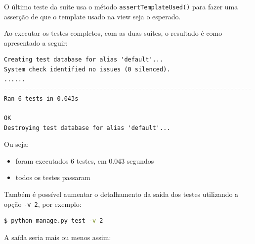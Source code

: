 \documentclass[brazil,a4paper,oneside,openright,parskip=full]{book}
\newcommand{\passthrough}[1]{#1}
\providecommand{\tightlist}{%
  \setlength{\itemsep}{0pt}\setlength{\parskip}{0pt}}
\begin{document}
O último teste da suíte usa o método
\passthrough{\lstinline!assertTemplateUsed()!} para fazer uma asserção
de que o template usado na view seja o esperado.

Ao executar os testes completos, com as duas suítes, o resultado é como
apresentado a seguir:

\begin{lstlisting}[style=nonumber]
Creating test database for alias 'default'...
System check identified no issues (0 silenced).
......
----------------------------------------------------------------------
Ran 6 tests in 0.043s

OK
Destroying test database for alias 'default'...
\end{lstlisting}

Ou seja:

\begin{itemize}
\tightlist
\item
  foram executados 6 testes, em 0.043 segundos
\item
  todos os testes passaram
\end{itemize}

Também é possível aumentar o detalhamento da saída dos testes utilizando
a opção \passthrough{\lstinline!-v 2!}, por exemplo:

\begin{lstlisting}[language=sh, style=nonumber]
$ python manage.py test -v 2
\end{lstlisting}

A saída seria mais ou menos assim:
\end{document}
